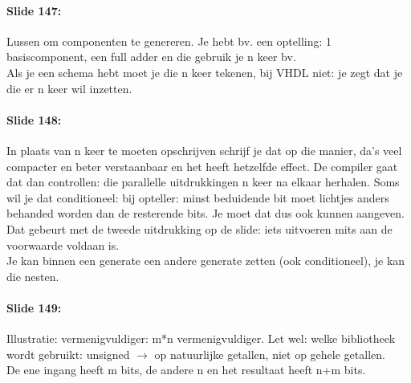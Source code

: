 \documentclass[10pt,a4paper]{book}
\begin{document}
\paragraph{Slide 147:} Lussen om componenten te genereren. Je hebt bv. een optelling: 1 basiscomponent, een full adder en die gebruik je n keer bv.\\
Als je een schema hebt moet je die n keer tekenen, bij VHDL niet: je zegt dat je die er n keer wil inzetten.

\paragraph{Slide 148:} In plaats van n keer te moeten opschrijven schrijf je dat op die manier, da's veel compacter en beter verstaanbaar en het heeft hetzelfde effect. De compiler gaat dat dan controllen: die parallelle uitdrukkingen n keer na elkaar herhalen. Soms wil je dat conditioneel: bij opteller: minst beduidende bit moet lichtjes anders behanded worden dan de resterende bits. Je moet dat dus ook kunnen aangeven. Dat gebeurt met de tweede uitdrukking op de slide: iets uitvoeren mits aan de voorwaarde voldaan is.\\
Je kan binnen een generate een andere generate zetten (ook conditioneel), je kan die nesten.

\paragraph{Slide 149:} Illustratie: vermenigvuldiger: m*n vermenigvuldiger. Let wel: welke bibliotheek wordt gebruikt: unsigned $\rightarrow$ op natuurlijke getallen, niet op gehele getallen.\\
De ene ingang heeft m bits, de andere n en het resultaat heeft n+m bits. 
\end{document}
